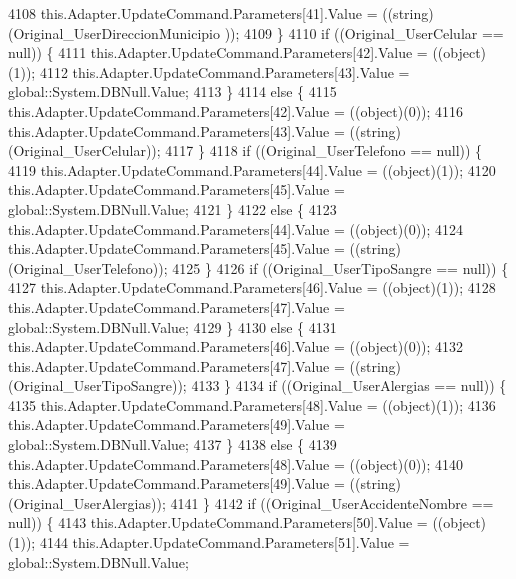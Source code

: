 \begin{DoxyCode}
4108                 this.Adapter.UpdateCommand.Parameters[41].Value = ((string)(Original\_UserDireccionMunicipio
      ));
4109             \}
4110             \textcolor{keywordflow}{if} ((Original\_UserCelular == null)) \{
4111                 this.Adapter.UpdateCommand.Parameters[42].Value = ((object)(1));
4112                 this.Adapter.UpdateCommand.Parameters[43].Value = global::System.DBNull.Value;
4113             \}
4114             \textcolor{keywordflow}{else} \{
4115                 this.Adapter.UpdateCommand.Parameters[42].Value = ((object)(0));
4116                 this.Adapter.UpdateCommand.Parameters[43].Value = ((string)(Original\_UserCelular));
4117             \}
4118             \textcolor{keywordflow}{if} ((Original\_UserTelefono == null)) \{
4119                 this.Adapter.UpdateCommand.Parameters[44].Value = ((object)(1));
4120                 this.Adapter.UpdateCommand.Parameters[45].Value = global::System.DBNull.Value;
4121             \}
4122             \textcolor{keywordflow}{else} \{
4123                 this.Adapter.UpdateCommand.Parameters[44].Value = ((object)(0));
4124                 this.Adapter.UpdateCommand.Parameters[45].Value = ((string)(Original\_UserTelefono));
4125             \}
4126             \textcolor{keywordflow}{if} ((Original\_UserTipoSangre == null)) \{
4127                 this.Adapter.UpdateCommand.Parameters[46].Value = ((object)(1));
4128                 this.Adapter.UpdateCommand.Parameters[47].Value = global::System.DBNull.Value;
4129             \}
4130             \textcolor{keywordflow}{else} \{
4131                 this.Adapter.UpdateCommand.Parameters[46].Value = ((object)(0));
4132                 this.Adapter.UpdateCommand.Parameters[47].Value = ((string)(Original\_UserTipoSangre));
4133             \}
4134             \textcolor{keywordflow}{if} ((Original\_UserAlergias == null)) \{
4135                 this.Adapter.UpdateCommand.Parameters[48].Value = ((object)(1));
4136                 this.Adapter.UpdateCommand.Parameters[49].Value = global::System.DBNull.Value;
4137             \}
4138             \textcolor{keywordflow}{else} \{
4139                 this.Adapter.UpdateCommand.Parameters[48].Value = ((object)(0));
4140                 this.Adapter.UpdateCommand.Parameters[49].Value = ((string)(Original\_UserAlergias));
4141             \}
4142             \textcolor{keywordflow}{if} ((Original\_UserAccidenteNombre == null)) \{
4143                 this.Adapter.UpdateCommand.Parameters[50].Value = ((object)(1));
4144                 this.Adapter.UpdateCommand.Parameters[51].Value = global::System.DBNull.Value;

\end{DoxyCode}
